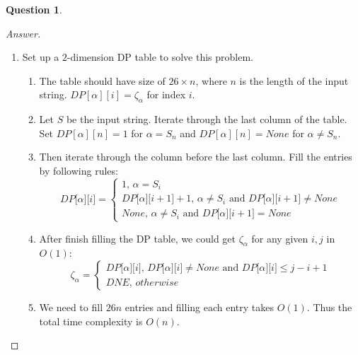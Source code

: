 \documentclass{article}
\theoremstyle{plain}
\newtheorem{question}{Question}
\newenvironment{answer}[1][Answer]
    {\begin{proof}[#1]{$ $}\renewcommand\qedsymbol{$\vartriangle$}}
    {\end{proof}}
\begin{document}
\begin{question}
\end{question}
\begin{answer}
    \begin{enumerate}
        \item Set up a $2$-dimension DP table to solve this problem.
        \begin{enumerate}
            \item
            The table should have size of $26 \times n$, where $n$ is the length of the input string. $DP[\alpha][i]= \zeta_\alpha$ for index $i$.
            \item
            Let $S$ be the input string. Iterate through the last column of the table. Set $DP[\alpha][n] = 1$ for $\alpha = S_n$ and $DP[\alpha][n] = None$ for $\alpha \neq S_n$.
            \item
            Then iterate through the column before the last column. Fill the entries by following rules:
            \begin{equation*}
                DP \lbrack \alpha \rbrack \lbrack i \rbrack =
                \begin{cases}
                    1,\, \alpha = S_i \\
                    DP \lbrack \alpha \rbrack \lbrack i+1 \rbrack + 1,\, \alpha \neq S_i \text{ and } DP \lbrack \alpha \rbrack \lbrack i+1 \rbrack \neq None \\
                    None,\, \alpha \neq S_i \text{ and } DP \lbrack \alpha \rbrack \lbrack i+1 \rbrack = None
                \end{cases}
            \end{equation*}
            \item
            After finish filling the DP table, we could get $\zeta_\alpha$ for any given $i, j$ in $O(1)$:
            \begin{equation*}
                \zeta_\alpha =
                \begin{cases}
                    DP \lbrack \alpha \rbrack \lbrack i \rbrack,\, DP \lbrack \alpha \rbrack \lbrack i \rbrack \neq None \text{ and } DP \lbrack \alpha \rbrack \lbrack i \rbrack \leq j - i + 1\\
                    DNE,\, otherwise
                \end{cases}
            \end{equation*}
            \item We need to fill $26n$ entries and filling each entry takes $O(1)$. Thus the total time complexity is $O(n)$.

\end{enumerate}
\end{enumerate}
\end{answer}
\end{document}
